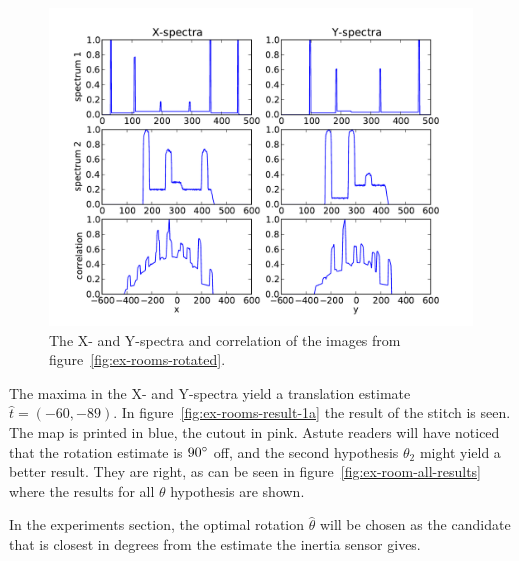 \begin{figure}[ht]
	\centering
	\includegraphics[width=\textwidth]{images/stitching/rooms-ex-xy-corr.pdf}
	\caption{The X- and Y-spectra and correlation of the images from figure~\ref{fig:ex-rooms-rotated}.}
	\label{fig:ex-rooms-spectra}
\end{figure}

The maxima in the X- and Y-spectra yield a translation estimate $\hat t = (-60, -89)$. In figure~\ref{fig:ex-rooms-result-1a} the result of the stitch is seen. The map is printed in blue, the cutout in pink. Astute readers will have noticed that the rotation estimate is $90\degree$ off, and the second hypothesis $\theta_{2}$ might yield a better result. They are right, as can be seen in figure~\ref{fig:ex-room-all-results} where the results for all $\theta$ hypothesis are shown.

In the experiments section, the optimal rotation $\hat \theta$ will be chosen as the candidate that is closest in degrees from the estimate the inertia sensor gives.

